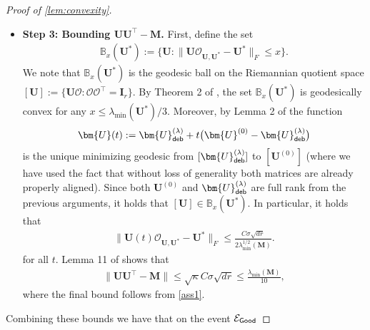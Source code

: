 \documentclass[10pt]{article}
\newcommand{\s}{^*}
\renewcommand{\t}{^{\top}}
\theoremstyle{definition}
\begin{document}
\begin{proof}[Proof of \cref{lem:convexity}]
\begin{itemize}
\begin{align}
    \| \bm{U} \|^2 \leq 4 \| \bm{M} \|.
\end{align}
    By Lemma 6 of \citet{ge_no_2017} it holds that
\begin{align}
    \| \bm{U}^{(0)} \mathcal{O}_{\bm{U}^{(0)},\bm{U}\s} - \bm{U}\s \|_F \leq \frac{1}{2 \lambda_{\min}^{1/2}(\bm{M})} \| \bm{U}^{(0)} \bm{U}^{(0)\top} - \bm{M} \|_F \leq \frac{C \sigma \sqrt{dr}}{2\lambda_{\min}^{1/2}(\bm{M})}.
    \end{align}
    \item \textbf{Step 3: Bounding $\bm{UU}\t - \bm{M}$.}
    First, define the set
    \begin{align}
        \mathbb{B}_x(\bm{U}\s) := \{ \bm{U}: \| \bm{U} \mathcal{O}_{\bm{U},\bm{U}\s} - \bm{U}\s \|_F \leq x \}.
    \end{align}
    We note that  $\mathbb{B}_x(\bm{U}\s)$ is the geodesic ball on the Riemannian quotient space $[\bm{U}] := \{ \bm{U} \mathcal{O}: \mathcal{OO}\t = \bm{I}_r \}$. By Theorem 2 of \citet{luo_nonconvex_2022}, the set $\mathbb{B}_x(\bm{U}\s)$ is geodesically convex for any $x \leq \lambda_{\min}(\bm{U}\s)/3$. Moreover, by Lemma 2 of \citet{luo_nonconvex_2022} the function
    \begin{align}
        \bm{U}(t) := \bm{U}_{{\sf deb}}^{(\lambda)} + t \big( \bm{U}^{(0)} - \bm{U}_{{\sf deb}}^{(\lambda)} \big)
    \end{align}
    is the unique minimizing geodesic from $[\bm{U}_{{\sf deb}}^{(\lambda)}]$ to $[\bm{U}^{(0)}]$ (where we have used the fact that without loss of generality both matrices are already properly aligned).  Since both $\bm{U}^{(0)}$ and $\bm{U}_{{\sf deb}}^{(\lambda)}$ are full rank from the previous arguments, it holds that $[\bm{U}] \in \mathbb{B}_x(\bm{U}\s)$.  In particular, it holds that
    \begin{align}
        \| \bm{U}(t) \mathcal{O}_{\bm{U},\bm{U}\s} - \bm{U}\s \|_F \leq \frac{C \sigma \sqrt{dr}}{2\lambda_{\min}^{1/2}(\bm{M})}.
    \end{align}
     for all $t$.  Lemma 11 of \citet{luo_nonconvex_2022} shows that
     \begin{align}
         \| \bm{UU}\t - \bm{M} \| \leq \sqrt{\kappa} C \sigma \sqrt{dr} \leq \frac{\lambda_{\min}(\bm{M})}{10},
     \end{align}
     where the final bound follows from \cref{ass1}.  
     \end{itemize}
Combining these bounds we have that on the event $\mathcal{E}_{{\sf Good}}$ 

\end{proof}
\end{document}
